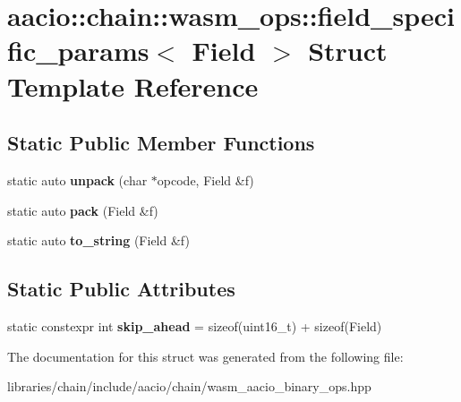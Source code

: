 \hypertarget{structaacio_1_1chain_1_1wasm__ops_1_1field__specific__params}{}\section{aacio\+:\+:chain\+:\+:wasm\+\_\+ops\+:\+:field\+\_\+specific\+\_\+params$<$ Field $>$ Struct Template Reference}
\label{structaacio_1_1chain_1_1wasm__ops_1_1field__specific__params}
\subsection*{Static Public Member Functions}
\begin{DoxyCompactItemize}
\item 
\mbox{\label{structaacio_1_1chain_1_1wasm__ops_1_1field__specific__params_a554452f8f9354b426f12e77b7da8cfae}} 
static auto {\bfseries unpack} (char $\ast$opcode, Field \&f)
\item 
\mbox{\label{structaacio_1_1chain_1_1wasm__ops_1_1field__specific__params_a891385b5d3447c5680fd12ad13680f94}} 
static auto {\bfseries pack} (Field \&f)
\item 
\mbox{\label{structaacio_1_1chain_1_1wasm__ops_1_1field__specific__params_af510dd71d6a9480a4d3287dbd8b6a5d5}} 
static auto {\bfseries to\+\_\+string} (Field \&f)
\end{DoxyCompactItemize}
\subsection*{Static Public Attributes}
\begin{DoxyCompactItemize}
\item 
\mbox{\label{structaacio_1_1chain_1_1wasm__ops_1_1field__specific__params_a26a8f509dcbef0936de4ef44b3d2f4b7}} 
static constexpr int {\bfseries skip\+\_\+ahead} = sizeof(uint16\+\_\+t) + sizeof(Field)
\end{DoxyCompactItemize}


The documentation for this struct was generated from the following file\+:\begin{DoxyCompactItemize}
\item 
libraries/chain/include/aacio/chain/wasm\+\_\+aacio\+\_\+binary\+\_\+ops.\+hpp\end{DoxyCompactItemize}
